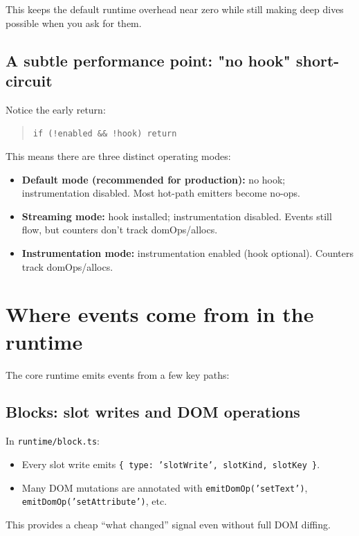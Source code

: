 This keeps the default runtime overhead near zero while still making deep dives possible when you ask for them.

\subsection{A subtle performance point: "no hook" short-circuit}

Notice the early return:

\begin{quote}
	\texttt{if (!enabled \&\& !hook) return}
\end{quote}

This means there are three distinct operating modes:

\begin{itemize}
\item \textbf{Default mode (recommended for production):} no hook; instrumentation disabled. Most hot-path emitters become no-ops.
\item \textbf{Streaming mode:} hook installed; instrumentation disabled. Events still flow, but counters don't track domOps/allocs.
\item \textbf{Instrumentation mode:} instrumentation enabled (hook optional). Counters track domOps/allocs.
\end{itemize}

\section{Where events come from in the runtime}

The core runtime emits events from a few key paths:

\subsection{Blocks: slot writes and DOM operations}

In \texttt{runtime/block.ts}:

\begin{itemize}
\item Every slot write emits \texttt{\{ type: 'slotWrite', slotKind, slotKey \}}.
\item Many DOM mutations are annotated with \texttt{emitDomOp('setText')}, \texttt{emitDomOp('setAttribute')}, etc.
\end{itemize}

This provides a cheap ``what changed'' signal even without full DOM diffing.

